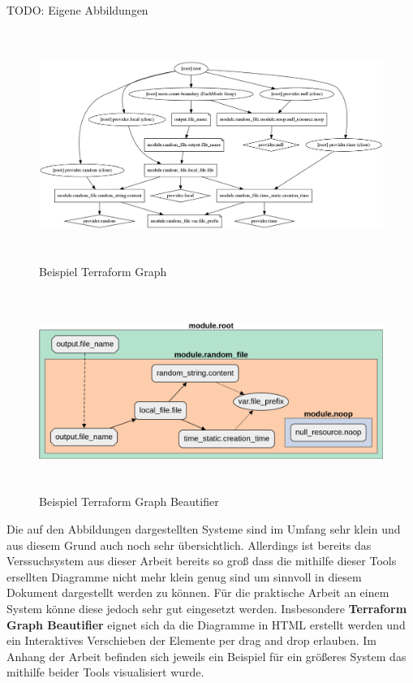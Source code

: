 TODO: Eigene Abbildungen

\begin{figure}[H]
  \includegraphics[keepaspectratio, height=7.5cm]{fig/hauptteil/terraform-graph.png}
  \caption{Beispiel Terraform Graph}
  \centering
\end{figure}

\begin{figure}[H]
  \includegraphics[keepaspectratio, height=6.5cm]{fig/hauptteil/terraform-graph-beautifier.png}
  \caption{Beispiel Terraform Graph Beautifier}
  \centering
\end{figure}

Die auf den Abbildungen dargestellten Systeme sind im Umfang sehr klein und aus
diesem Grund auch noch sehr übersichtlich. Allerdings ist bereits das Verssuchsystem
aus dieser Arbeit bereits so groß dass die mithilfe dieser Tools ersellten
Diagramme nicht mehr klein genug sind um sinnvoll in diesem Dokument dargestellt
werden zu können. Für die praktische Arbeit an einem System könne diese jedoch
sehr gut eingesetzt werden. Insbesondere \textbf{Terraform Graph Beautifier}
eignet sich da die Diagramme in HTML erstellt werden
und ein Interaktives Verschieben der Elemente per drag and drop erlauben.
Im Anhang der Arbeit befinden sich jeweils ein Beispiel für ein größeres
System das mithilfe beider Tools visualisiert wurde.

